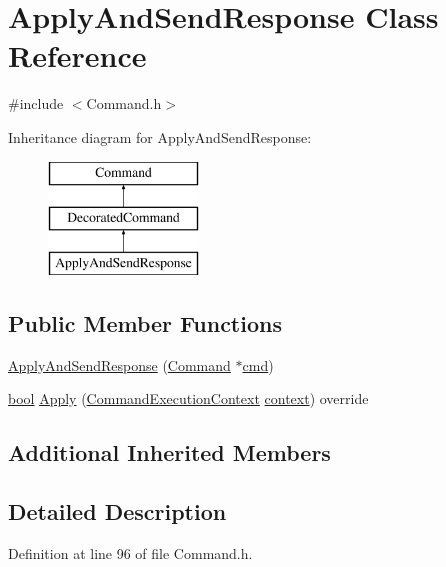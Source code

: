 \hypertarget{class_apply_and_send_response}{}\section{Apply\+And\+Send\+Response Class Reference}
\label{class_apply_and_send_response}


{\ttfamily \#include $<$Command.\+h$>$}

Inheritance diagram for Apply\+And\+Send\+Response\+:\begin{figure}[H]
\begin{center}
\leavevmode
\includegraphics[height=3.000000cm]{class_apply_and_send_response}
\end{center}
\end{figure}
\subsection*{Public Member Functions}
\begin{DoxyCompactItemize}
\item 
\hyperlink{class_apply_and_send_response_ad9e40deaac9e0ae71bbb8f920209d43a}{Apply\+And\+Send\+Response} (\hyperlink{class_command}{Command} $\ast$\hyperlink{sndfile__play_8m_adfc5ba7e22f5e4a6221c12a70503bef3}{cmd})
\item 
\hyperlink{mac_2config_2i386_2lib-src_2libsoxr_2soxr-config_8h_abb452686968e48b67397da5f97445f5b}{bool} \hyperlink{class_apply_and_send_response_a99fd3902c13710e0fbe7ad3b7ebd4175}{Apply} (\hyperlink{class_command_execution_context}{Command\+Execution\+Context} \hyperlink{structcontext}{context}) override
\end{DoxyCompactItemize}
\subsection*{Additional Inherited Members}


\subsection{Detailed Description}


Definition at line 96 of file Command.\+h.



